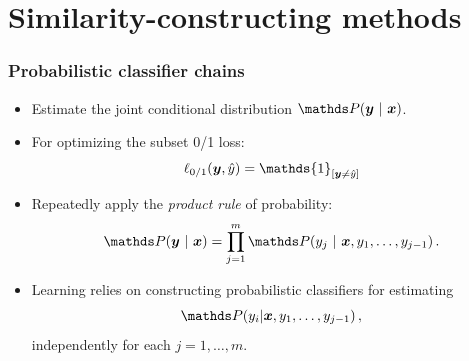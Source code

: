\section{Similarity-constructing methods}




\begin{frame}
	\frametitle{Probabilistic classifier chains}
	
	\begin{itemize}
		\item Estimate the \alert{joint} conditional distribution $\P(\yv ~|~  \xv)$. 
		\item For optimizing the \alert{subset 0/1} loss:  $$ \ell_{0/1}(\yv, \hat{y}) = \mathds{1}_{[\yv \ne \hat{y}]}$$
		\item Repeatedly apply the \emph{product rule} of probability:
		$$
		\P(\yv ~|~ \xv) = \prod_{j=1}^{m} \P(y_j ~|~ \xv, y_1, \ldots,y_{j-1}) \, .
		$$
		\item  Learning relies on constructing \alert{probabilistic classifiers} for estimating 
		$$
		\P( y_i|\xv, y_1, \ldots,y_{j-1}) \,,
		$$
		{independently} for each $j = 1, \ldots, m$. 
	\end{itemize}
\end{frame}

